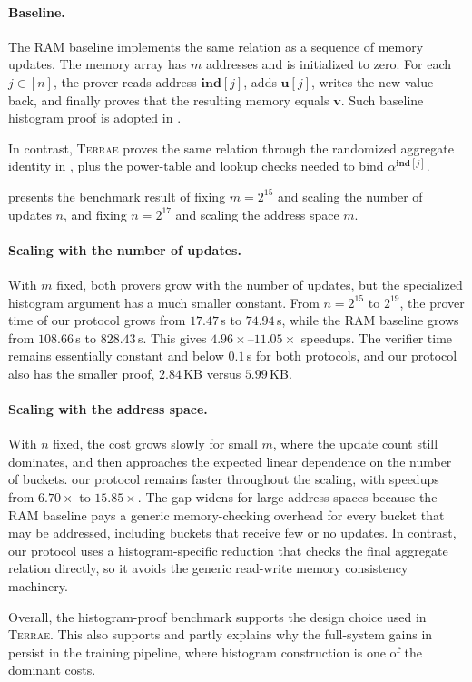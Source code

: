 \paragraph{Baseline.}
The RAM baseline implements the same relation as a sequence of memory updates.
The memory array has $m$ addresses and is initialized to zero. For each
$j\in[n]$, the prover reads address $\mathbf{ind}[j]$, adds $\mathbf{u}[j]$,
writes the new value back, and finally proves that the resulting memory
equals $\mathbf{v}$.
Such baseline histogram proof is adopted in \cite{sparrow24,zkboost26}.

In contrast, \textsc{Terrae} proves the
same relation through the randomized aggregate identity in
, plus the power-table and lookup
checks needed to bind $\alpha^{\mathbf{ind}[j]}$.

 presents the benchmark result
of fixing $m=2^{15}$ and scaling the number of updates
$n$, and  fixing $n=2^{17}$ and scaling the address
space $m$.





\paragraph{Scaling with the number of updates.}
With $m$ fixed, both provers grow with the number of updates, but the
specialized histogram argument has a much smaller constant.  From
$n=2^{15}$ to $2^{19}$, the prover time of our protocol grows from
$17.47$\,s to $74.94$\,s, while the RAM baseline grows from $108.66$\,s to
$828.43$\,s.  This gives $4.96\times$--$11.05\times$ speedups.  The verifier
time remains essentially constant and below $0.1$\,s for both protocols, and
our protocol also has the smaller proof, $2.84$\,KB versus $5.99$\,KB.

\paragraph{Scaling with the address space.}
With $n$ fixed, the cost grows slowly for small $m$, where the update count
still dominates, and then approaches the expected linear dependence on the
number of buckets.  our protocol remains faster throughout the scaling, with
speedups from $6.70\times$ to $15.85\times$.
The gap widens for large address spaces because the RAM baseline pays a
  generic memory-checking overhead for every bucket that may be addressed,
  including buckets that receive few or no updates.  In contrast,
  our protocol uses a histogram-specific reduction that checks the final
  aggregate relation directly, so it avoids the generic read-write memory
  consistency machinery.

Overall, the histogram-proof benchmark supports the design choice used in \textsc{Terrae}.
This also supports and partly explains why the full-system gains in
 persist in the training pipeline, where histogram
construction is one of the dominant costs.
